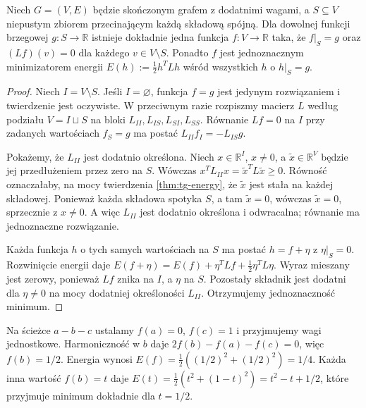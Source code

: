 \begin{twierdzenie}
\label{thm:tg-dirichlet}
Niech $G=(V,E)$ będzie skończonym grafem z dodatnimi
wagami, a $S\subseteq V$ niepustym zbiorem przecinającym
każdą składową spójną. Dla dowolnej funkcji brzegowej
$g:S\to\mathbb R$ istnieje dokładnie jedna funkcja
$f:V\to\mathbb R$ taka, że $f|_S=g$ oraz
$(Lf)(v)=0$ dla każdego $v\in V\setminus S$.
Ponadto $f$ jest jednoznacznym minimizatorem energii
$E(h):=\tfrac12 h^TLh$ wśród wszystkich $h$ o $h|_S=g$.
\end{twierdzenie}

\begin{proof}
Niech $I=V\setminus S$. Jeśli $I=\varnothing$, funkcja $f=g$
jest jedynym rozwiązaniem i twierdzenie jest oczywiste.
W przeciwnym razie rozpiszmy macierz $L$ według podziału
$V=I\sqcup S$ na bloki $L_{II},L_{IS},L_{SI},L_{SS}$.
Równanie $Lf=0$ na $I$ przy zadanych wartościach
$f_S=g$ ma postać $L_{II}f_I=-L_{IS}g$.

Pokażemy, że $L_{II}$ jest dodatnio określona. Niech
$x\in\mathbb R^I$, $x\ne0$, a $\widetilde x\in\mathbb R^V$
będzie jej przedłużeniem przez zero na $S$.
Wówczas $x^TL_{II}x=\widetilde x^TL\widetilde x\ge0$.
Równość oznaczałaby, na mocy twierdzenia
\ref{thm:tg-energy}, że $\widetilde x$ jest stała
na każdej składowej. Ponieważ każda składowa spotyka $S$,
a tam $\widetilde x=0$, wówczas $\widetilde x=0$,
sprzecznie z $x\ne0$. A więc $L_{II}$ jest dodatnio
określona i odwracalna; równanie ma jednoznaczne rozwiązanie.

Każda funkcja $h$ o tych samych wartościach na $S$
ma postać $h=f+\eta$ z $\eta|_S=0$.
Rozwinięcie energii daje
$E(f+\eta)=E(f)+\eta^TLf+\tfrac12\eta^TL\eta$.
Wyraz mieszany jest zerowy, ponieważ $Lf$ znika na
$I$, a $\eta$ na $S$. Pozostały składnik jest dodatni
dla $\eta\ne0$ na mocy dodatniej określoności $L_{II}$.
Otrzymujemy jednoznaczność minimum.
\end{proof}

\begin{przyklad}
Na ścieżce $a-b-c$ ustalamy $f(a)=0$, $f(c)=1$
i przyjmujemy wagi jednostkowe. Harmoniczność w $b$ daje
$2f(b)-f(a)-f(c)=0$, więc $f(b)=1/2$.
Energia wynosi $E(f)=\tfrac12((1/2)^2+(1/2)^2)=1/4$.
Każda inna wartość $f(b)=t$ daje
$E(t)=\tfrac12(t^2+(1-t)^2)=t^2-t+1/2$,
które przyjmuje minimum dokładnie dla $t=1/2$.
\end{przyklad}

\begin{center}
\end{center}

